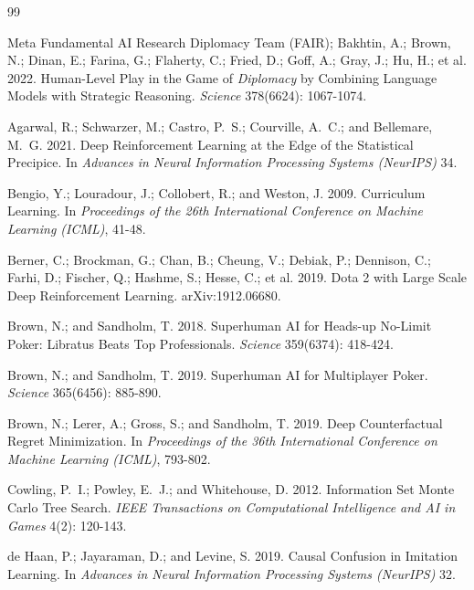 \documentclass[letterpaper]{article} %
\begin{document}

\begin{thebibliography}{99}
\setlength{\itemsep}{0.15em}

Meta Fundamental AI Research Diplomacy Team (FAIR); Bakhtin, A.; Brown, N.;
Dinan, E.; Farina, G.; Flaherty, C.; Fried, D.; Goff, A.; Gray, J.; Hu, H.;
et al. 2022.
Human-Level Play in the Game of \emph{Diplomacy} by Combining Language Models
with Strategic Reasoning.
\emph{Science} 378(6624): 1067-1074.

Agarwal, R.; Schwarzer, M.; Castro, P.~S.; Courville, A.~C.; and Bellemare, M.~G.
2021.
Deep Reinforcement Learning at the Edge of the Statistical Precipice.
In \emph{Advances in Neural Information Processing Systems (NeurIPS)} 34.

Bengio, Y.; Louradour, J.; Collobert, R.; and Weston, J. 2009.
Curriculum Learning.
In \emph{Proceedings of the 26th International Conference on Machine Learning
(ICML)}, 41-48.

Berner, C.; Brockman, G.; Chan, B.; Cheung, V.; Debiak, P.; Dennison, C.;
Farhi, D.; Fischer, Q.; Hashme, S.; Hesse, C.; et al. 2019.
Dota 2 with Large Scale Deep Reinforcement Learning.
arXiv:1912.06680.

Brown, N.; and Sandholm, T. 2018.
Superhuman AI for Heads-up No-Limit Poker: Libratus Beats Top Professionals.
\emph{Science} 359(6374): 418-424.

Brown, N.; and Sandholm, T. 2019.
Superhuman AI for Multiplayer Poker.
\emph{Science} 365(6456): 885-890.

Brown, N.; Lerer, A.; Gross, S.; and Sandholm, T. 2019.
Deep Counterfactual Regret Minimization.
In \emph{Proceedings of the 36th International Conference on Machine Learning
(ICML)}, 793-802.

Cowling, P.~I.; Powley, E.~J.; and Whitehouse, D. 2012.
Information Set Monte Carlo Tree Search.
\emph{IEEE Transactions on Computational Intelligence and AI in Games} 4(2):
120-143.

de Haan, P.; Jayaraman, D.; and Levine, S. 2019.
Causal Confusion in Imitation Learning.
In \emph{Advances in Neural Information Processing Systems (NeurIPS)} 32.


\end{thebibliography}
\end{document}
